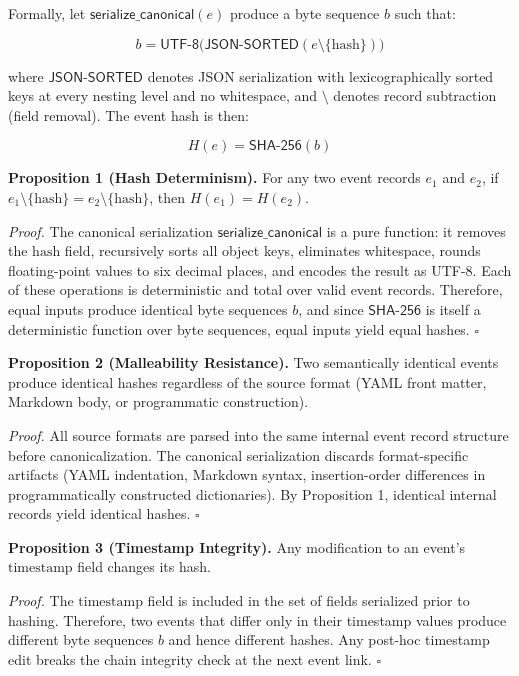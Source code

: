 Formally, let \(\mathsf{serialize\_canonical}(e)\) produce a byte sequence \(b\) such that:

\[
b = \mathsf{UTF\text{-}8}\bigl(\mathsf{JSON\text{-}SORTED}(e \setminus \{\text{hash}\})\bigr)
\]

where \(\mathsf{JSON\text{-}SORTED}\) denotes JSON serialization with lexicographically sorted keys at every nesting level and no whitespace, and \(\setminus\) denotes record subtraction (field removal). The event hash is then:

\[
H(e) = \mathsf{SHA\text{-}256}(b)
\]

\textbf{Proposition 1 (Hash Determinism).} For any two event records \(e_1\) and \(e_2\), if \(e_1 \setminus \{\text{hash}\} = e_2 \setminus \{\text{hash}\}\), then \(H(e_1) = H(e_2)\).

\emph{Proof.} The canonical serialization \(\mathsf{serialize\_canonical}\) is a pure function: it removes the \(\text{hash}\) field, recursively sorts all object keys, eliminates whitespace, rounds floating-point values to six decimal places, and encodes the result as UTF-8. Each of these operations is deterministic and total over valid event records. Therefore, equal inputs produce identical byte sequences \(b\), and since \(\mathsf{SHA\text{-}256}\) is itself a deterministic function over byte sequences, equal inputs yield equal hashes. \(\square\)

\textbf{Proposition 2 (Malleability Resistance).} Two semantically identical events produce identical hashes regardless of the source format (YAML front matter, Markdown body, or programmatic construction).

\emph{Proof.} All source formats are parsed into the same internal event record structure before canonicalization. The canonical serialization discards format-specific artifacts (YAML indentation, Markdown syntax, insertion-order differences in programmatically constructed dictionaries). By Proposition 1, identical internal records yield identical hashes. \(\square\)

\textbf{Proposition 3 (Timestamp Integrity).} Any modification to an event's \(\text{timestamp}\) field changes its hash.

\emph{Proof.} The \(\text{timestamp}\) field is included in the set of fields serialized prior to hashing. Therefore, two events that differ only in their timestamp values produce different byte sequences \(b\) and hence different hashes. Any post-hoc timestamp edit breaks the chain integrity check at the next event link. \(\square\)

